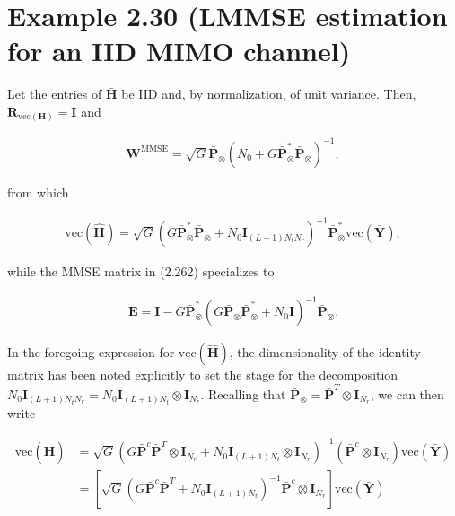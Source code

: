 \documentclass[a4paper, 12pt]{book}
\begin{document}
\section*{Example 2.30 (LMMSE estimation for an IID MIMO channel)}

Let the entries of $\bar{\boldsymbol{H}}$ be IID and, by normalization, of unit variance. Then, $\boldsymbol{R}_{\text{vec}(\boldsymbol{H})} = \boldsymbol{I}$ and

\begin{align}
\boldsymbol{W}^{\text{MMSE}} = \sqrt{G} \bar{\boldsymbol{P}}_{\otimes} (N_0 + G \bar{\boldsymbol{P}}_{\otimes}^* \bar{\boldsymbol{P}}_{\otimes})^{-1}, \tag{2.270}
\end{align}

from which

\begin{align}
\text{vec}(\hat{\boldsymbol{H}}) = \sqrt{G} \left( G \bar{\boldsymbol{P}}_{\otimes}^* \bar{\boldsymbol{P}}_{\otimes} + N_0 \boldsymbol{I}_{(L+1)N_t N_r} \right)^{-1} \bar{\boldsymbol{P}}_{\otimes}^* \text{vec}(\bar{\boldsymbol{Y}}), \tag{2.271}
\end{align}

while the MMSE matrix in (2.262) specializes to

\begin{align}
\boldsymbol{E} = \boldsymbol{I} - G \bar{\boldsymbol{P}}_{\otimes}^* (G \bar{\boldsymbol{P}}_{\otimes} \bar{\boldsymbol{P}}_{\otimes}^* + N_0 \boldsymbol{I})^{-1} \bar{\boldsymbol{P}}_{\otimes}. \tag{2.272}
\end{align}

In the foregoing expression for $\text{vec}(\hat{\boldsymbol{H}})$, the dimensionality of the identity matrix has been noted explicitly to set the stage for the decomposition $N_0 \boldsymbol{I}_{(L+1)N_t N_r} = N_0 \boldsymbol{I}_{(L+1)N_t} \otimes \boldsymbol{I}_{N_r}$. Recalling that $\bar{\boldsymbol{P}}_{\otimes} = \bar{\boldsymbol{P}}^T \otimes \boldsymbol{I}_{N_r}$, we can then write

\begin{align}
\text{vec}(\hat{\boldsymbol{H}}) &= \sqrt{G} \left( G \bar{\boldsymbol{P}}^c \bar{\boldsymbol{P}}^T \otimes \boldsymbol{I}_{N_r} + N_0 \boldsymbol{I}_{(L+1)N_t} \otimes \boldsymbol{I}_{N_r} \right)^{-1} (\bar{\boldsymbol{P}}^c \otimes \boldsymbol{I}_{N_r}) \text{vec}(\bar{\boldsymbol{Y}}) \tag{2.273} \\
&= \left[ \sqrt{G} (G \bar{\boldsymbol{P}}^c \bar{\boldsymbol{P}}^T + N_0 \boldsymbol{I}_{(L+1)N_t})^{-1} \bar{\boldsymbol{P}}^c \otimes \boldsymbol{I}_{N_r} \right] \text{vec}(\bar{\boldsymbol{Y}}) \tag{2.274}
\end{align}
\end{document}
